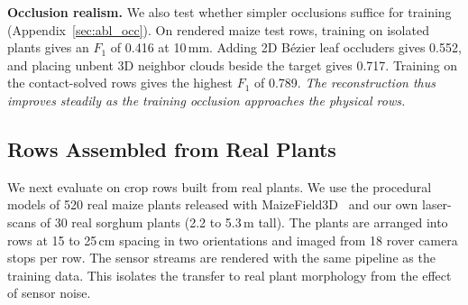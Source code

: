 \documentclass[10pt,twocolumn,letterpaper]{article}
\begin{document}
\noindent\textbf{Occlusion realism.}
We also test whether simpler occlusions suffice for training (Appendix~\ref{sec:abl_occ}). On rendered maize test rows, training on isolated plants gives an $F_1$ of 0.416 at 10\,mm. Adding 2D B\'ezier leaf occluders gives 0.552, and placing unbent 3D neighbor clouds beside the target gives 0.717. Training on the contact-solved rows gives the highest $F_1$ of 0.789. \textit{The reconstruction thus improves steadily as the training occlusion approaches the physical rows.}

\subsection{Rows Assembled from Real Plants}
\label{sec:res-field}\label{sec:exp-real}

We next evaluate on crop rows built from real plants. We use the procedural models of 520 real maize plants released with MaizeField3D~\citep{maizefield3d2025} and our own laser-scans of 30 real sorghum plants (2.2 to 5.3\,m tall). The plants are arranged into rows at 15 to 25\,cm spacing in two orientations and imaged from 18 rover camera stops per row. The sensor streams are rendered with the same pipeline as the training data. This isolates the transfer to real plant morphology from the effect of sensor noise.
\end{document}
